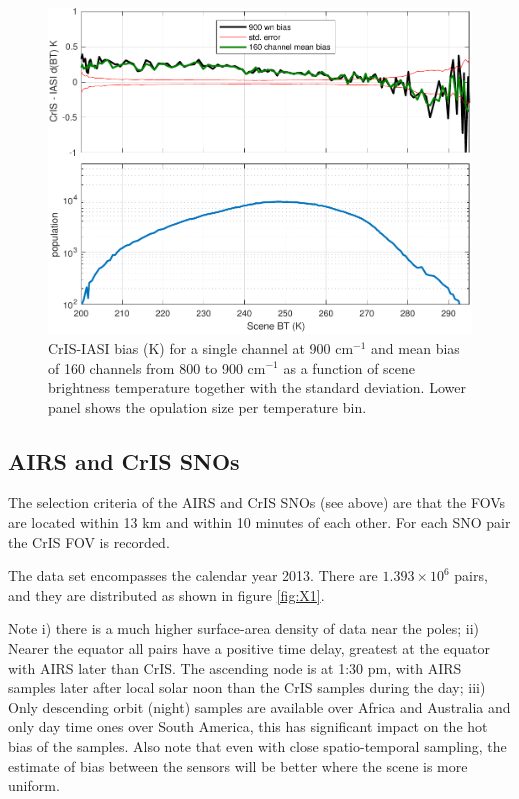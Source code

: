 \documentclass[twocolumn,10pt]{article}
\begin{document}
\begin{figure}[htb]
\centering
\includegraphics[width=\linewidth]{./figs/ic_jpl_sno_bias_stderr_vs_scene_LW_chans.pdf}
\caption{\label{fig:orgparagraph9}
  CrIS-IASI bias (K) for a single channel at 900 cm$^{-1}$ and mean bias of 160 channels from 800 to 900 cm$^{-1}$ as a function of scene brightness temperature together with the standard deviation. Lower panel shows the opulation size per temperature bin.}
\label{fig:X8}
\end{figure}


\subsection{AIRS and CrIS SNOs}
\label{sec:orgheadline9}

The selection criteria of the AIRS and CrIS SNOs (see above) are that the FOVs are located
within 13 km and within 10 minutes of each other. For each SNO pair the CrIS FOV is recorded. 

The data set encompasses the calendar year 2013. There are $1.393\times 10^{6}$ pairs, and they are distributed as shown in figure \ref{fig:X1}.

Note i) there is a much higher surface-area density of data near the poles; 
ii) Nearer the equator all pairs have a positive time delay, greatest at the equator with AIRS later than CrIS. The ascending node is at 1:30 pm, with
AIRS samples later after local solar noon than the CrIS samples during the day; 
iii) Only descending orbit (night) samples are available over Africa and Australia and only day time ones over South America, this has significant impact on the hot bias of the samples. Also note that even with close spatio-temporal sampling, the estimate of bias between the sensors will be better where the scene is more uniform.
\end{document}
